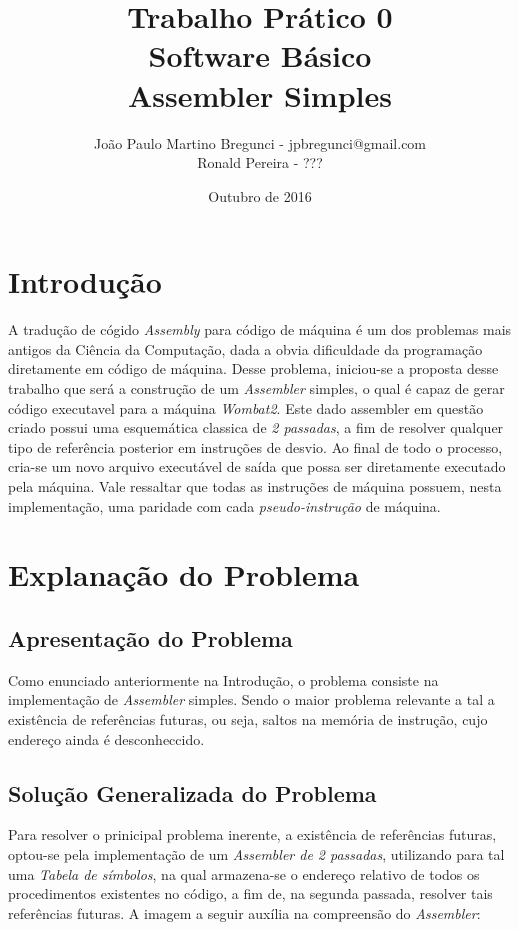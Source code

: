 \documentclass{article}
\title{Trabalho Prático 0 \\ Software Básico
\\ Assembler Simples}
\author{João Paulo Martino Bregunci - jpbregunci@gmail.com
\\ Ronald Pereira - ???}
\date{Outubro de 2016}
\begin{document}
\maketitle


\section{Introdução}
A tradução de cógido \textit{Assembly} para código de máquina é um dos problemas mais antigos da Ciência da Computação, dada a obvia dificuldade da programação diretamente em código de máquina. Desse problema, iniciou-se a proposta desse trabalho que será a construção de um \textit{Assembler} simples, o qual é capaz de gerar código executavel para a máquina \textit{Wombat2}. Este dado assembler em questão criado possui uma esquemática classica de \textit{2 passadas}, a fim de resolver qualquer tipo de referência posterior em instruções de desvio.
Ao final de todo o processo, cria-se um novo arquivo executável de saída que possa ser diretamente executado pela máquina. Vale ressaltar que todas as instruções de máquina possuem, nesta implementação, uma paridade com cada \textit{pseudo-instrução} de máquina.


\section{Explanação do Problema}
\subsection{Apresentação do Problema}
Como enunciado anteriormente na Introdução, o problema consiste na implementação de \textit{Assembler} simples. Sendo o maior problema relevante a tal a existência de referências futuras, ou seja, saltos na memória de instrução, cujo endereço ainda é desconheccido.

\subsection{Solução Generalizada do Problema}
Para resolver o prinicipal problema inerente, a existência de referências futuras, optou-se pela implementação de um \textit{Assembler de 2 passadas}, utilizando para tal uma \textit{Tabela de símbolos}, na qual armazena-se o endereço relativo de todos os procedimentos existentes no código, a fim de, na segunda passada, resolver tais referências futuras. A imagem a seguir auxília na compreensão do \textit{Assembler}:
\end{document}
